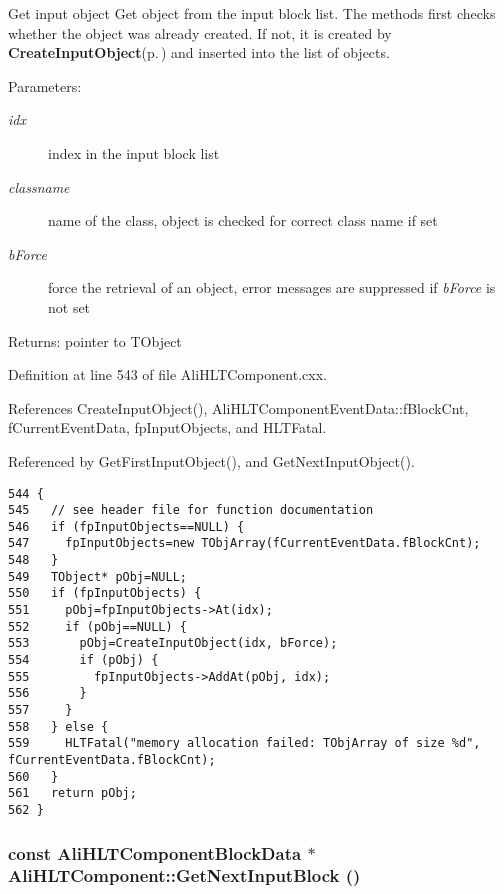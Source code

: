 Get input object Get object from the input block list. The methods first checks whether the object was already created. If not, it is created by {\bf Create\-Input\-Object}{\rm (p.\,\pageref{classAliHLTComponent_d3})} and inserted into the list of objects. \begin{Desc}
\item[Parameters:]
\begin{description}
\item[{\em idx}]index in the input block list \item[{\em classname}]name of the class, object is checked for correct class name if set \item[{\em b\-Force}]force the retrieval of an object, error messages are suppressed if {\em b\-Force\/} is not set \end{description}
\end{Desc}
\begin{Desc}
\item[Returns:]pointer to TObject \end{Desc}


Definition at line 543 of file Ali\-HLTComponent.cxx.

References Create\-Input\-Object(), Ali\-HLTComponent\-Event\-Data::f\-Block\-Cnt, f\-Current\-Event\-Data, fp\-Input\-Objects, and HLTFatal.

Referenced by Get\-First\-Input\-Object(), and Get\-Next\-Input\-Object().

\footnotesize\begin{verbatim}544 {
545   // see header file for function documentation
546   if (fpInputObjects==NULL) {
547     fpInputObjects=new TObjArray(fCurrentEventData.fBlockCnt);
548   }
549   TObject* pObj=NULL;
550   if (fpInputObjects) {
551     pObj=fpInputObjects->At(idx);
552     if (pObj==NULL) {
553       pObj=CreateInputObject(idx, bForce);
554       if (pObj) {
555         fpInputObjects->AddAt(pObj, idx);
556       }
557     }
558   } else {
559     HLTFatal("memory allocation failed: TObjArray of size %d", fCurrentEventData.fBlockCnt);
560   }
561   return pObj;
562 }
\end{verbatim}\normalsize 


\subsubsection{\setlength{\rightskip}{0pt plus 5cm}const {\bf Ali\-HLTComponent\-Block\-Data} $\ast$ Ali\-HLTComponent::Get\-Next\-Input\-Block ()\hspace{0.3cm}{\tt  [protected]}}\label{classAliHLTComponent_b21}


